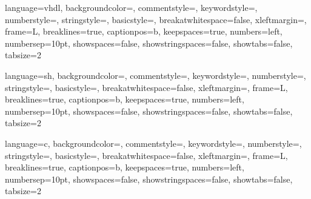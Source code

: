 \usepackage{listings}
\usepackage{color}


\renewcommand{\lstlistingname}{Code}

	{
    language=vhdl,
    backgroundcolor=\color{backcolour},
    commentstyle=\color{lightgray},
    keywordstyle=\color{purple},
    numberstyle=\tiny\color{gray},
    stringstyle=\color{blue},
    basicstyle=\footnotesize,
    breakatwhitespace=false,
    xleftmargin=\parindent,
    frame=L,
    breaklines=true,
    captionpos=b,
    keepspaces=true,
    numbers=left,
    numbersep=10pt,
    showspaces=false,
    showstringspaces=false,
    showtabs=false,
    tabsize=2
}

	{
    language=sh,
    backgroundcolor=\color{backcolour},
    commentstyle=\color{lightgray},
    keywordstyle=\color{amethyst},
    numberstyle=\small\color{gray},
    stringstyle=\color{blue},
    basicstyle=\footnotesize,
    breakatwhitespace=false,
    xleftmargin=\parindent,
    frame=L,
    breaklines=true,
    captionpos=b,
    keepspaces=true,
    numbers=left,
    numbersep=10pt,
    showspaces=false,
    showstringspaces=false,
    showtabs=false,
    tabsize=2
}

	{
    language=c,
    backgroundcolor=\color{backcolour},
    commentstyle=\color{lightgray},
    keywordstyle=\color{amethyst},
    numberstyle=\small\color{gray},
    stringstyle=\color{blue},
    basicstyle=\footnotesize,
    breakatwhitespace=false,
    xleftmargin=\parindent,
    frame=L,
    breaklines=true,
    captionpos=b,
    keepspaces=true,
    numbers=left,
    numbersep=10pt,
    showspaces=false,
    showstringspaces=false,
    showtabs=false,
    tabsize=2
}


